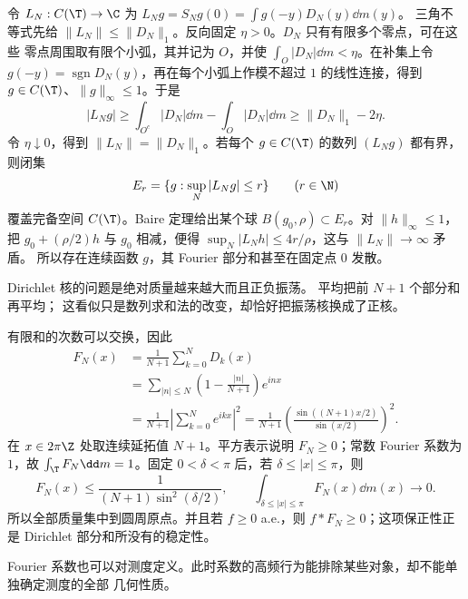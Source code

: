 \begin{example}
令 $L_N:C(\T)\to\C$ 为 $L_Ng=S_Ng(0)=\int g(-y)D_N(y)\dd m(y)$。
三角不等式先给 $\|L_N\|\leq\|D_N\|_1$。反向固定 $\eta>0$。$D_N$ 只有有限多个零点，可在这些
零点周围取有限个小弧，其并记为 $O$，并使
$\int_O|D_N|\dd m<\eta$。在补集上令
$g(-y)=\operatorname{sgn}D_N(y)$，再在每个小弧上作模不超过 $1$ 的线性连接，得到
$g\in C(\T)$、$\|g\|_\infty\leq1$。于是
\[
 |L_Ng|
 \geq\int_{O^c}|D_N|\dd m-\int_O|D_N|\dd m
 \geq\|D_N\|_1-2\eta.
\]
令 $\eta\downarrow0$，得到 $\|L_N\|=\|D_N\|_1$。若每个 $g\in C(\T)$ 的数列
$(L_Ng)$ 都有界，则闭集
\[
 E_r=\{g:\sup_N|L_Ng|\leq r\}\qquad(r\in\N)
\]
覆盖完备空间 $C(\T)$。Baire 定理给出某个球
$B(g_0,\rho)\subset E_r$。对 $\|h\|_\infty\leq1$，把
$g_0+(\rho/2)h$ 与 $g_0$ 相减，便得
$\sup_N|L_Nh|\leq4r/\rho$，这与 $\|L_N\|\to\infty$ 矛盾。
所以存在连续函数 $g$，其 Fourier 部分和甚至在固定点 $0$ 发散。
\end{example}

Dirichlet 核的问题是绝对质量越来越大而且正负振荡。\Cesaro{} 平均把前 $N+1$ 个部分和再平均；
这看似只是数列求和法的改变，却恰好把振荡核换成了正核。

\begin{example}[\Fejer{} 正核]\label{ex:7-2-1-2}
有限和的次数可以交换，因此
\begin{align*}
 F_N(x)
 &=\frac1{N+1}\sum_{k=0}^ND_k(x)\\
 &=\sum_{|n|\leq N}\left(1-\frac{|n|}{N+1}\right)e^{inx}\\
 &=\frac1{N+1}\left|\sum_{k=0}^Ne^{ikx}\right|^2
 =\frac1{N+1}\left(\frac{\sin((N+1)x/2)}{\sin(x/2)}\right)^2.
\end{align*}
在 $x\in2\pi\Z$ 处取连续延拓值 $N+1$。平方表示说明 $F_N\geq0$；常数 Fourier
系数为 $1$，故 $\int_\T F_N\dd m=1$。固定 $0<\delta<\pi$ 后，若
$\delta\leq|x|\leq\pi$，则
\[
 F_N(x)\leq\frac1{(N+1)\sin^2(\delta/2)},
 \qquad
 \int_{\delta\leq|x|\leq\pi}F_N(x)\dd m(x)\longrightarrow0.
\]
所以全部质量集中到圆周原点。并且若 $f\geq0$ a.e.，则
$f*F_N\geq0$；这项保正性正是 Dirichlet 部分和所没有的稳定性。
\end{example}

Fourier 系数也可以对测度定义。此时系数的高频行为能排除某些对象，却不能单独确定测度的全部
几何性质。

